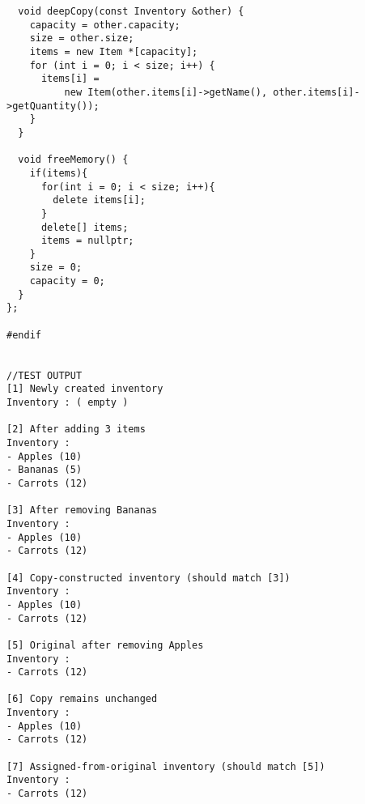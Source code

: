 \documentclass[11pt]{article}
\begin{document}
\begin{verbatim}
  void deepCopy(const Inventory &other) {
    capacity = other.capacity;
    size = other.size;
    items = new Item *[capacity];
    for (int i = 0; i < size; i++) {
      items[i] =
          new Item(other.items[i]->getName(), other.items[i]->getQuantity());
    }
  }

  void freeMemory() {
    if(items){
      for(int i = 0; i < size; i++){
        delete items[i];
      }
      delete[] items;
      items = nullptr;
    }
    size = 0;
    capacity = 0;
  }
};

#endif


//TEST OUTPUT
[1] Newly created inventory
Inventory : ( empty )

[2] After adding 3 items
Inventory :
- Apples (10)
- Bananas (5)
- Carrots (12)

[3] After removing Bananas
Inventory :
- Apples (10)
- Carrots (12)

[4] Copy-constructed inventory (should match [3])
Inventory :
- Apples (10)
- Carrots (12)

[5] Original after removing Apples
Inventory :
- Carrots (12)

[6] Copy remains unchanged
Inventory :
- Apples (10)
- Carrots (12)

[7] Assigned-from-original inventory (should match [5])
Inventory :
- Carrots (12)



\end{verbatim}
\end{document}
